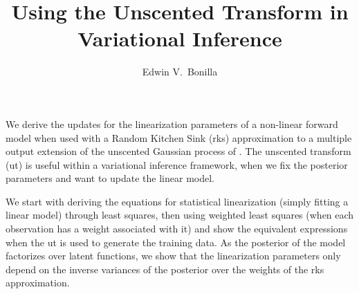 \documentclass[11pt,a4paper]{article}
\title{Using the Unscented Transform in Variational Inference}
\author{Edwin V.~Bonilla}
\newcommand{\ut}{{\sc ut}\xspace}
\newcommand{\rks}{{\sc rks}\xspace}
\begin{document}
\maketitle
We derive the updates for the linearization parameters of a non-linear forward model
when used with a Random Kitchen Sink (\rks) approximation to a multiple output
extension of the unscented Gaussian process of . 
The unscented transform (\ut) is useful within a variational inference framework,
when we fix the posterior parameters and want to update the linear model. 

We start with deriving the equations for statistical linearization (simply fitting a linear model) 
through least squares, then using weighted least squares (when each observation has a 
weight associated with it) and show the equivalent expressions when the \ut
is used to generate the training data.
%
As the posterior of the model factorizes over latent functions, we show that the linearization 
parameters only depend on the inverse variances of the posterior over the weights of 
the \rks approximation. 
\end{document}
